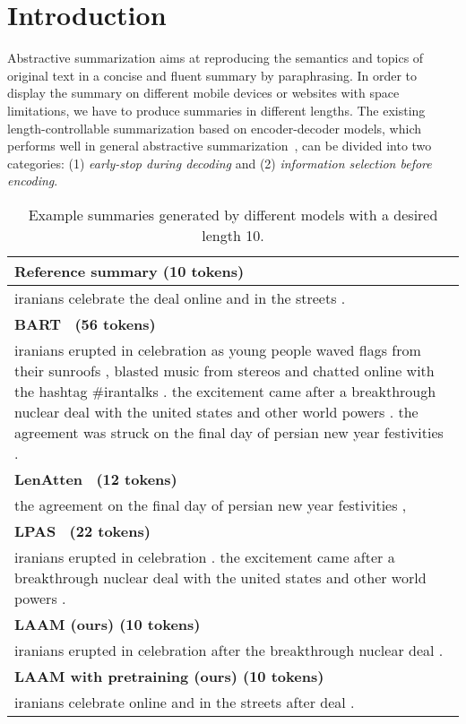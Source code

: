 \section{Introduction}
\label{sec:intro}
Abstractive summarization aims at reproducing the semantics and 
topics of original text in a concise and fluent summary by paraphrasing.
In order to display the summary on different mobile devices 
or websites with space limitations, we have to produce summaries in different lengths. 
The existing length-controllable summarization based on encoder-decoder models, which performs well in general abstractive summarization~\cite{NallapatiZSGX16,SeeLM17,CelikyilmazBHC18,UniLM19,BART19,setlevel21,GSum21}, can be divided into two categories:
(1) \textit{early-stop during decoding} and (2) \textit{information selection 
before encoding}.

\begin{table}[th!]
	\centering
	\scriptsize
	\begin{tabular}{|p{7.8cm}|}
		\hline \bf Reference summary (10 tokens) \\
		\hline
		iranians celebrate the deal online and in the streets . \\
		\hline 
		\bf BART~\cite{BART19} (56 tokens)\\
		\hline 
		iranians erupted in celebration as young people waved flags from their sunroofs , blasted music from stereos and chatted online with the hashtag $\#$irantalks . the excitement came after a breakthrough nuclear deal with the united states and other world powers . the agreement was struck on the final day of persian new year festivities . \\
		\hline 
		\bf LenAtten~\cite{lenatten21} (12 tokens) \\
		\hline  
		the agreement on the final day of persian new year festivities , \\
		\hline 
		\bf  LPAS~\cite{Proto20} (22 tokens) \\
		\hline 
		iranians erupted in celebration . the excitement came after a breakthrough nuclear deal with the united states and other world powers . \\
		\hline
		\bf  LAAM (ours) (10 tokens) \\
		\hline
		iranians erupted in celebration after the breakthrough nuclear deal .\\
		\hline 
		\bf  LAAM with pretraining (ours) (10 tokens)\\
		\hline 
		iranians celebrate online and in the streets after deal . \\
		\hline
	\end{tabular}
	\caption{\label{tab:intro} Example summaries generated by
		different models with a desired length 10. 
	}
\end{table}

